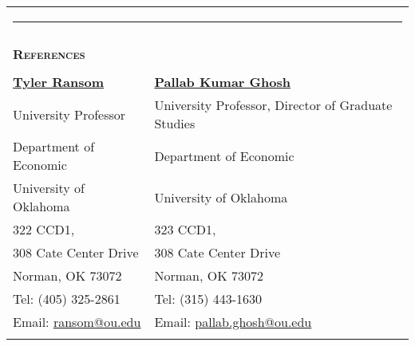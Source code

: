 \documentclass[10pt,letterpaper]{article}
\begin{document}






\begin{tabular}{p{4.25 in}p{3.75in}}
	\multicolumn{2}{p{7.5in}}{\hrule}\\
	\\
	{\large \textsc{\textbf{\large{References}}}} &\\
	\\
	\href{https://tyleransom.github.io/}{\textbf{Tyler Ransom}}                      & \href{https://sites.google.com/site/pallabghoshou/}{\textbf{Pallab Kumar Ghosh}} \\
	University Professor                                                                              & University Professor, Director of Graduate Studies \\
	Department of Economic                                                             & Department of Economic  \\
	University of Oklahoma                                                                    & University of Oklahoma \\
	322 CCD1,                                                                                   & 323 CCD1, \\
	308 Cate Center Drive                                                                              & 308 Cate Center Drive  \\
	Norman, OK 73072                                                                              & Norman, OK 73072   \\
	Tel: (405) 325-2861                                                                          & Tel: (315) 443-1630 \\
	Email: \href{ransom@ou.edu}{ransom@ou.edu}                        & Email: \href{pallab.ghosh@ou.edu}{pallab.ghosh@ou.edu}  \\ \\
	
	
	

\end{tabular}
\end{document}
